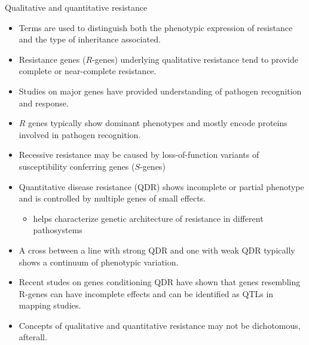\documentclass[11pt,dvipsnames,ignorenonframetext,aspectratio=169]{beamer}
\providecommand{\tightlist}{%
  \setlength{\itemsep}{0pt}\setlength{\parskip}{0pt}}
\begin{document}
\begin{frame}{Qualitative and quantitative resistance}
\protect\hypertarget{qualitative-and-quantitative-resistance}{}
\footnotesize

\begin{itemize}
\tightlist
\item
  Terms are used to distinguish both the phenotypic expression of
  resistance and the type of inheritance associated.
\item
  Resistance genes (\(R\)-genes) underlying qualitative resistance tend
  to provide complete or near-complete resistance.
\item
  Studies on major genes have provided understanding of pathogen
  recognition and response.
\item
  \(R\) genes typically show dominant phenotypes and mostly encode
  proteins involved in pathogen recognition.
\item
  Recessive resistance may be caused by loss-of-function variants of
  susceptibility conferring genes (\(S\)-genes)
\item
  Quantitative disease resistance (QDR) shows incomplete or partial
  phenotype and is controlled by multiple genes of small effects.

  \begin{itemize}
  \tightlist
  \item
    helps characterize genetic architecture of resistance in different
    pathosystems
  \end{itemize}
\item
  A cross between a line with strong QDR and one with weak QDR typically
  shows a continuum of phenotypic variation.
\item
  Recent studes on genes conditioning QDR have shown that genes
  resembling R-genes can have incomplete effects and can be identified
  as QTLs in mapping studies.
\item
  Concepts of qualitative and quantitative resistance may not be
  dichotomous, afterall.
\end{itemize}
\end{frame}
\end{document}
